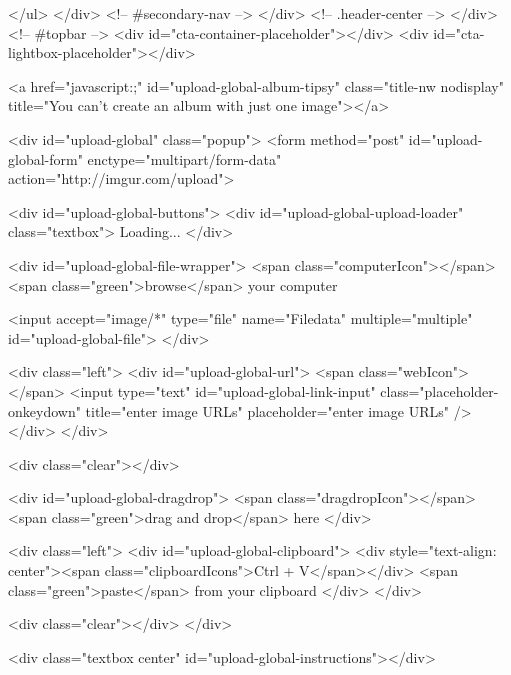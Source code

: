             </ul>
        </div> <!-- #secondary-nav -->
    </div> <!-- .header-center -->
</div> <!-- #topbar -->
<div id="cta-container-placeholder"></div>
<div id="cta-lightbox-placeholder"></div>

        
    

    

            

        
    

            <a href="javascript:;" id="upload-global-album-tipsy" class="title-nw nodisplay" title="You can't create an album with just one image"></a>

<div id="upload-global" class="popup">
    <form method="post" id="upload-global-form" enctype="multipart/form-data" action="http://imgur.com/upload">
        

        <div id="upload-global-buttons">
            <div id="upload-global-upload-loader" class="textbox">
                Loading...
            </div>

            <div id="upload-global-file-wrapper">
                <span class="computerIcon"></span>
                <span class="green">browse</span> your computer

                <input accept="image/*" type="file" name="Filedata" multiple="multiple" id="upload-global-file">
            </div>

            <div class="left">
                <div id="upload-global-url">
                    <span class="webIcon"></span>
                    <input type="text" id="upload-global-link-input" class="placeholder-onkeydown" title="enter image URLs" placeholder="enter image URLs" />
                </div>
            </div>

            <div class="clear"></div>

            <div id="upload-global-dragdrop">
                <span class="dragdropIcon"></span>
                <span class="green">drag and drop</span> here
            </div>

            <div class="left">
                <div id="upload-global-clipboard">
                    <div style="text-align: center"><span class="clipboardIcons">Ctrl + V</span></div>
                    <span class="green">paste</span> from your clipboard
                </div>
            </div>

            <div class="clear"></div>
        </div>

        <div class="textbox center" id="upload-global-instructions"></div>

